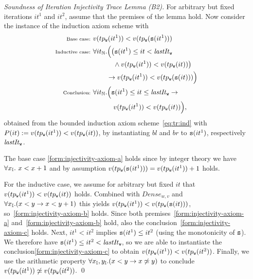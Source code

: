 \begin{proof}[Soundness of Iteration Injectivity Trace Lemma (B2)]
	For arbitrary but fixed iterations $it^1$ and $it^2$, assume that the premises of the lemma hold.
	Now consider the instance of the induction axiom scheme with
	\begin{subequations}	
		\begin{align}
		\text{{\scriptsize Base case: }}&v(tp_{\texttt{w}}(it^1)) < v(tp_{\texttt{w}}({\tt s}(it^1))) \label{form:injectivity-axiom-a}\\
		\text{{\scriptsize Inductive case: }}&\forall it_{\mathbb{N}}. \Big(\big({\tt s}(it^1) \leq it < \mathit{lastIt}_{\texttt{w}}  \nonumber\\
		&		\qquad\quad\land v(tp_{\texttt{w}}(it^1)) < v(tp_{\texttt{w}}(it)) \big) \label{form:injectivity-axiom-b}\\
		&\qquad\rightarrow v(tp_{\texttt{w}}(it^1)) < v(tp_{\texttt{w}}({\tt s}(it))) \Big) \nonumber\\
		\hspace*{-1em}\text{{\scriptsize Conclusion: }}&\forall
		it_{\mathbb{N}}. \Big({\tt s}(it^1)
		\leq it \leq
		\mathit{lastIt}_{\texttt{w}}
		\rightarrow
		\nonumber\\
		& \qquad\quad v(tp_{\texttt{w}}(it^1)) < v(tp_{\texttt{w}}(it)) \Big),\label{form:injectivity-axiom-c}
		\end{align}
	\end{subequations} 
	obtained from the bounded induction axiom
	scheme~\eqref{eq:tr:ind} with $P(it) := v(tp_{\texttt{w}}(it^1)) <
	v(tp_{\texttt{w}}(it))$, by instantiating $bl$ and $br$ to
	${\tt s}(it^1)$, respectively $\mathit{lastIt}_{\texttt{w}}$.
	
	The base case \eqref{form:injectivity-axiom-a} holds since by integer theory we have $\forall x_{\mathbb{I}}.\ x<x+1$ and by assumption $v(tp_{\texttt{w}}({\tt s}(it^1))) = v(tp_{\texttt{w}}(it^1)) + 1$ holds.
	
	For the inductive case, we assume for arbitrary but fixed $it$ that $v(tp_{\texttt{w}}(it^1)) < v(tp_{\texttt{w}}(it))$ holds. Combined with $\mathit{Dense}_{w,v}$ and $\forall x_{\mathbb{I}}. (x<y \rightarrow x<y+1)$ this yields $v(tp_{\texttt{w}}(it^1)) < v(tp_{\texttt{w}}({\tt s}(it)))$, so~\eqref{form:injectivity-axiom-b} holds.
	Since both premises~\eqref{form:injectivity-axiom-a}
	and~\eqref{form:injectivity-axiom-b} hold, also the
	conclusion~\eqref{form:injectivity-axiom-c} holds. Next,
	$it^1<it^2$ implies ${\tt s}(it^1)\leq it^2$ (using the
	monotonicity of ${\tt s}$). We therefore have ${\tt s}(it^1)\leq
	it^2 < \mathit{lastIt}_{\texttt{w}}$, so we are able to instantiate
	the conclusion\eqref{form:injectivity-axiom-c} to obtain
	$v(tp_{\texttt{w}}(it^1)) < v(tp_{\texttt{w}}(it^2))$. Finally, we use the
	arithmetic property $\forall x_{\mathbb{I}}, y_{\mathbb{I}}. (x<y \rightarrow x \not\simeq
	y)$ to conclude $v(tp_{\texttt{w}}(it^1)) \not\simeq v(tp_{\texttt{w}}(it^2))$.
	\qed
\end{proof}